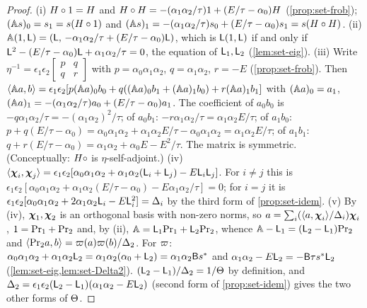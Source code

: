 \begin{proof}
(i) $H\circ 1 = H$ and $H\circ H = -(\alpha_1\alpha_2/\tau)1 + (E/\tau-\alpha_0)H$ (\cref{prop:set-frob}); $(\mathbb{A} s)_0 = s_1 = s(H\circ 1)$ and $(\mathbb{A} s)_1 = -(\alpha_1\alpha_2/\tau)s_0 + (E/\tau-\alpha_0)s_1 = s(H\circ H)$.
(ii) $\mathbb{A}(1,\mathsf{L}) = (\mathsf{L},\,-\alpha_1\alpha_2/\tau + (E/\tau-\alpha_0)\mathsf{L})$, which is $\mathsf{L}(1,\mathsf{L})$ if and only if $\mathsf{L}^2 - (E/\tau-\alpha_0)\mathsf{L} + \alpha_1\alpha_2/\tau = 0$, the equation of $\mathsf{L}_1,\mathsf{L}_2$ (\cref{lem:set-eig}).
(iii) Write $\eta^{-1} = \epsilon_1\epsilon_2\begin{bmatrix}p&q\\q&r\end{bmatrix}$ with $p = \alpha_0\alpha_1\alpha_2$, $q = \alpha_1\alpha_2$, $r = -E$ (\cref{prop:set-frob}). Then $\langle\mathbb{A} a,b\rangle = \epsilon_1\epsilon_2[p(\mathbb{A} a)_0b_0 + q((\mathbb{A} a)_0b_1 + (\mathbb{A} a)_1b_0) + r(\mathbb{A} a)_1b_1]$ with $(\mathbb{A} a)_0 = a_1$, $(\mathbb{A} a)_1 = -(\alpha_1\alpha_2/\tau)a_0 + (E/\tau-\alpha_0)a_1$. The coefficient of $a_0b_0$ is $-q\alpha_1\alpha_2/\tau = -(\alpha_1\alpha_2)^2/\tau$; of $a_0b_1$: $-r\alpha_1\alpha_2/\tau = \alpha_1\alpha_2E/\tau$; of $a_1b_0$: $p + q(E/\tau-\alpha_0) = \alpha_0\alpha_1\alpha_2 + \alpha_1\alpha_2E/\tau - \alpha_0\alpha_1\alpha_2 = \alpha_1\alpha_2E/\tau$; of $a_1b_1$: $q + r(E/\tau-\alpha_0) = \alpha_1\alpha_2 + \alpha_0E - E^2/\tau$. The matrix is symmetric. (Conceptually: $H\circ$ is $\eta$-self-adjoint.)
(iv) $\langle\boldsymbol{\chi}_i,\boldsymbol{\chi}_j\rangle = \epsilon_1\epsilon_2[\alpha_0\alpha_1\alpha_2 + \alpha_1\alpha_2(\mathsf{L}_i+\mathsf{L}_j) - E\mathsf{L}_i\mathsf{L}_j]$. For $i\neq j$ this is $\epsilon_1\epsilon_2[\alpha_0\alpha_1\alpha_2 + \alpha_1\alpha_2(E/\tau-\alpha_0) - E\alpha_1\alpha_2/\tau] = 0$; for $i = j$ it is $\epsilon_1\epsilon_2[\alpha_0\alpha_1\alpha_2 + 2\alpha_1\alpha_2\mathsf{L}_i - E\mathsf{L}_i^2] = \Delta_i$ by the third form of \cref{prop:set-idem}.
(v) By (iv), $\boldsymbol{\chi}_1,\boldsymbol{\chi}_2$ is an orthogonal basis with non-zero norms, so $a = \sum_i(\langle a,\boldsymbol{\chi}_i\rangle/\Delta_i)\boldsymbol{\chi}_i$, $1 = \mathrm{Pr}_1 + \mathrm{Pr}_2$ and, by (ii), $\mathbb{A} = \mathsf{L}_1\mathrm{Pr}_1 + \mathsf{L}_2\mathrm{Pr}_2$, whence $\mathbb{A} - \mathsf{L}_1 = (\mathsf{L}_2-\mathsf{L}_1)\mathrm{Pr}_2$ and $\langle\mathrm{Pr}_2a,b\rangle = \varpi(a)\varpi(b)/\Delta_2$. For $\varpi$: $\alpha_0\alpha_1\alpha_2 + \alpha_1\alpha_2\mathsf{L}_2 = \alpha_1\alpha_2(\alpha_0+\mathsf{L}_2) = \alpha_1\alpha_2\mathsf{B}s^{\ast}$ and $\alpha_1\alpha_2 - E\mathsf{L}_2 = -\mathsf{B}\tau s^{\ast}\mathsf{L}_2$ (\cref{lem:set-eig,lem:set-Delta2}). $(\mathsf{L}_2-\mathsf{L}_1)/\Delta_2 = 1/\Theta$ by definition, and $\Delta_2 = \epsilon_1\epsilon_2(\mathsf{L}_2-\mathsf{L}_1)(\alpha_1\alpha_2 - E\mathsf{L}_2)$ (second form of \cref{prop:set-idem}) gives the two other forms of $\Theta$.
\end{proof}

